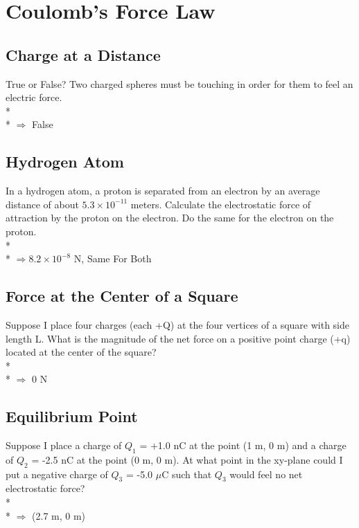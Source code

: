 \documentclass[11pt]{article}
\begin{document}

\pagebreak
\section{Coulomb's Force Law}
\vspace{10pt}

\subsection{Charge at a Distance}
True or False?  Two charged spheres must be touching in order for them to feel an electric force.\\* \\*
$\Rightarrow$ False

\subsection{Hydrogen Atom}
In a hydrogen atom, a proton is separated from an electron by an average distance of about $5.3 \times 10^{-11}$ meters.  Calculate the electrostatic force of attraction by the proton on the electron.  Do the same for the electron on the proton. \\* \\*
$\Rightarrow 8.2 \times 10^{-8}$ N, Same For Both

\subsection{Force at the Center of a Square}
Suppose I place four charges (each +Q) at the four vertices of a square with side length L.  What is the magnitude of the net force on a positive point charge (+q) located at the center of the square? \\* \\*
$\Rightarrow$ 0 N

\subsection{Equilibrium Point}
Suppose I place a charge of $Q_1$ = +1.0 nC at the point (1 m, 0 m) and a charge of $Q_2$ = -2.5 nC at the point (0 m, 0 m).  At what point in the xy-plane could I put a negative charge of $Q_3$ = -5.0 $\mu$C such that $Q_3$ would feel no net electrostatic force? \\* \\*
$\Rightarrow$ (2.7 m, 0 m)
\end{document}
